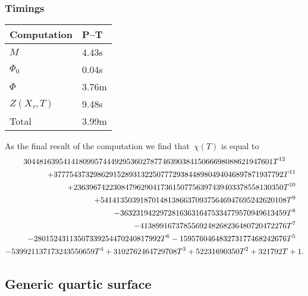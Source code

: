 \documentclass[a4paper,11pt]{article}
\numberwithin{equation}{section}
\theoremstyle{definition}
\begin{document}
\subsubsection{Timings}

\begin{center}
\begin{tabular}{l l} \toprule
Computation     & P--T \\ \midrule
$M$             & 4.43s     \\
$\Phi_0$        & 0.04s     \\
$\Phi$          & 3.76m     \\
$Z(X_{\tau},T)$ & 9.48s     \\
Total           & 3.99m     \\ \bottomrule
\end{tabular}
\end{center}

As the final result of the computation we find that~$\chi(T)$ is equal to 
\begin{multline*}
304481639541418099574449295360278774639038415066698088621947601T^{12} \\
\shoveright{+3777543732986291528931322507772938448980494046897871937792T^{11}} \\
\shoveright{+23639674223084796290417361507756397439403378558130350T^{10}} \\ 
\shoveright{+54141350391870148138663709375646947695242620108T^9} \\
\shoveright{-363231942297281636316475334779570949613459T^8} \\
\shoveright{-4138991673785569248268236480720472276T^7} \\
\shoveright{-28015243113507339254470240817992T^6 - 159576046483273177468242676T^5} \\ 
-539921137173243550659T^4 + 3102762464729708T^3 + 52231690350T^2 + 321792T + 1.
\end{multline*}

\subsection{Generic quartic surface}
\end{document}
